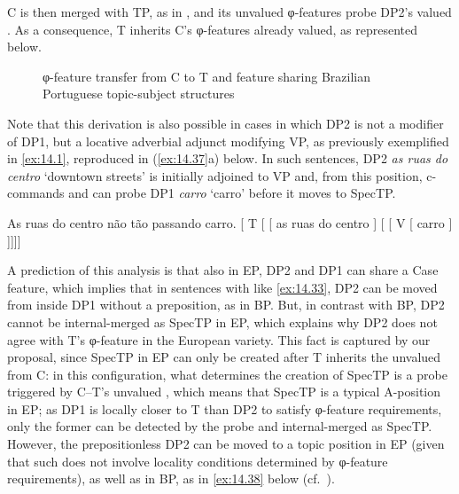 \documentclass[output=paper]{langsci/langscibook}
\begin{document}
C is then merged with TP, as in , and its unvalued
φ-features probe DP2’s valued . As a consequence, T inherits C’s
φ-features already valued, as represented below.

\begin{figure}%
    \caption{φ-feature transfer from C to T and feature sharing Brazilian
    Portuguese topic-subject structures\label{fig:ex:14.36}}
\end{figure}

Note that this derivation is also possible in cases in which DP2 is not a
modifier of DP1, but a locative adverbial adjunct modifying VP, as previously
exemplified in \eqref{ex:14.1}, reproduced in (\ref{ex:14.37}a) below.
In such sentences, DP2 \emph{as ruas do centro} ‘downtown streets’ is initially
adjoined to VP and, from this position, c-commands and can probe DP1
\emph{carro} ‘carro’ before it moves to SpecTP.

\ea%
    \label{ex:14.37}
	\ea     As ruas do centro não tão passando carro.
    \ex     {}[ T [ [ as ruas do centro ]
                [ [ V [ carro ] ]]]]
    \z
\z

A prediction of this analysis is that also in EP, DP2 and DP1 can share a Case
feature, which implies that in sentences with  like
\eqref{ex:14.33}, DP2 can be moved from inside DP1 without a preposition, as in
BP. But, in contrast with BP, DP2 cannot be internal-merged as SpecTP in EP,
which explains why DP2 does not agree with T’s φ-feature in the European
variety. This fact is captured by our proposal, since SpecTP in \gls{EP} can
only be created after T inherits the unvalued  from C\@: in this
configuration, what determines the creation of SpecTP is a probe triggered by
C--T’s unvalued , which means that SpecTP is a typical A-position in
\gls{EP}; as DP1 is locally closer to T than DP2 to satisfy φ-feature
requirements, only the former can be detected by the probe and internal-merged
as SpecTP\@.  However, the prepositionless DP2 can be moved to a topic position
in \gls{EP} (given that such  does not involve locality conditions
determined by φ-feature requirements), as well as in BP, as in \eqref{ex:14.38}
below (cf.\ \citealt{Costa2010,AvelarGalves2011}).
\end{document}
